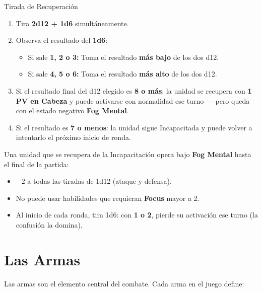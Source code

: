 \begin{reglaespecial}{Tirada de Recuperación}
\begin{enumerate}
    \item Tira \textbf{2d12 + 1d6} simultáneamente.
    \item Observa el resultado del \textbf{1d6}:
    \begin{itemize}
        \item Si sale \textbf{1, 2 o 3:} Toma el resultado \textbf{más bajo} de los dos d12.
        \item Si sale \textbf{4, 5 o 6:} Toma el resultado \textbf{más alto} de los dos d12.
    \end{itemize}
    \item Si el resultado final del d12 elegido es \textbf{8 o más}: la unidad se recupera con \textbf{1 PV en Cabeza} y puede activarse con normalidad ese turno — pero queda con el estado negativo \textbf{Fog Mental}.
    \item Si el resultado es \textbf{7 o menos}: la unidad sigue Incapacitada y puede volver a intentarlo el próximo inicio de ronda.
\end{enumerate}
\end{reglaespecial}

\begin{tcolorbox}[colback=GoldRule!10, colframe=GoldRule, title=\textbf{ESTADO: Fog Mental}]
\small Una unidad que se recupera de la Incapacitación opera bajo \textbf{Fog Mental} hasta el final de la partida:
\begin{itemize}
    \item $-2$ a todas las tiradas de 1d12 (ataque y defensa).
    \item No puede usar habilidades que requieran \textbf{Focus} mayor a 2.
    \item Al inicio de cada ronda, tira 1d6: con \textbf{1 o 2}, pierde su activación ese turno (la confusión la domina).
\end{itemize}
\end{tcolorbox}

\section{Las Armas}

Las armas son el elemento central del combate. Cada arma en el juego define:

